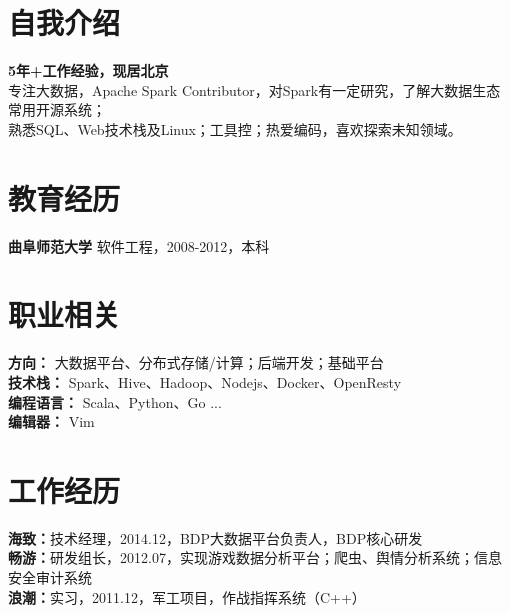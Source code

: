 \documentclass[UTF8,margin,line]{res}
\begin{document}

\begin{resume}

\section{\sc 自我介绍}
\textbf{5年+工作经验，现居北京} \\
专注大数据，Apache Spark Contributor，对Spark有一定研究，了解大数据生态常用开源系统； \\
熟悉SQL、Web技术栈及Linux；工具控；热爱编码，喜欢探索未知领域。

\section{\sc 教育经历}
\textbf{曲阜师范大学} 软件工程，2008-2012，本科

\section{\sc 职业相关}
\textbf{方向：} 大数据平台、分布式存储/计算；后端开发；基础平台 \\
\textbf{技术栈：} Spark、Hive、Hadoop、Nodejs、Docker、OpenResty \\
\textbf{编程语言：} Scala、Python、Go ... \\
\textbf{编辑器：} Vim

\section{\sc 工作经历}
\textbf{海致：}技术经理，2014.12，BDP大数据平台负责人，BDP核心研发 \\
\textbf{畅游：}研发组长，2012.07，实现游戏数据分析平台；爬虫、舆情分析系统；信息安全审计系统 \\
\textbf{浪潮：}实习，2011.12，军工项目，作战指挥系统（C++）


\end{resume}
\end{document}
